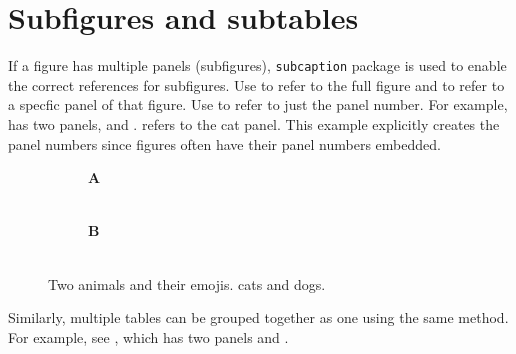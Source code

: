\section{Subfigures and subtables}
If a figure has multiple panels (subfigures), \texttt{subcaption} package is used to enable the correct references for subfigures.
Use \cmd{\fref} to refer to the full figure and \cmd{\fref} to refer to a specfic panel of that figure.
Use \cmd{\subcaptionref} to refer to just the panel number.
For example,  has two panels,  and .
 refers to the cat panel.
This example explicitly creates the panel numbers since figures often have their panel numbers embedded.

\begin{figure}[t]
    \begin{subfigure}[b]{.5\linewidth}
        \centering
        \textbf{\sffamily A}\\[-0.5\onelineskip]
        \HUGE {}\\
    \end{subfigure}%
    \begin{subfigure}[b]{.5\linewidth}
        \centering
        \textbf{\sffamily B}\\[-0.5\onelineskip]
        \HUGE {}\\
    \end{subfigure}
    \caption[Two animals and their emojis.]{%
        Two animals and their emojis.
         cats and  dogs.
    }
    \label{fig:subfigure-demo}
\end{figure}

Similarly, multiple tables can be grouped together as one using the same method. For example, see , which has two panels  and .

